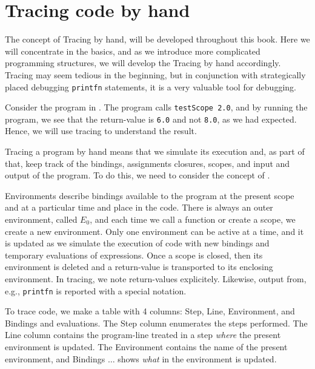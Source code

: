 \documentclass[fsharpNotes.tex]{subfiles}
\begin{document}
\section{Tracing code by hand}
The concept of Tracing by hand, will be developed throughout this book. Here we will concentrate in the basics, and as we introduce more complicated programming structures, we will develop the Tracing by hand accordingly. Tracing may seem tedious in the beginning, but in conjunction with strategically placed debugging \lstinline!printfn! statements, it is a very valuable tool for debugging.

Consider the program in .
%
%
The program calls \lstinline{testScope 2.0}, and by running the program, we see that the return-value is \lstinline{6.0} and not \lstinline{8.0}, as we had expected. Hence, we will use tracing to understand the result.

Tracing a program by hand means that we simulate its execution and, as part of that, keep track of the bindings, assignments closures, scopes, and input and output of the program. To do this, we need to consider the concept of .

Environments describe bindings available to the program at the present scope and at a particular time and place in the code. There is always an outer environment, called $E_0$, and each time we call a function or create a scope, we create a new environment. Only one environment can be active at a time, and it is updated as we simulate the execution of code with new bindings and temporary evaluations of expressions. Once a scope is closed, then its environment is deleted and a return-value is transported to its enclosing environment. In tracing, we note return-values explicitely. Likewise, output from, e.g., \lstinline{printfn} is reported with a special notation.

To trace code, we make a table with 4 columns: Step, Line, Environment, and Bindings and evaluations. The Step column enumerates the steps performed. The Line column contains the program-line treated in a step {\em where} the present environment is updated. The Environment contains the name of the present environment, and Bindings $\ldots$ shows {\em what}  in the environment is updated.
\end{document}
